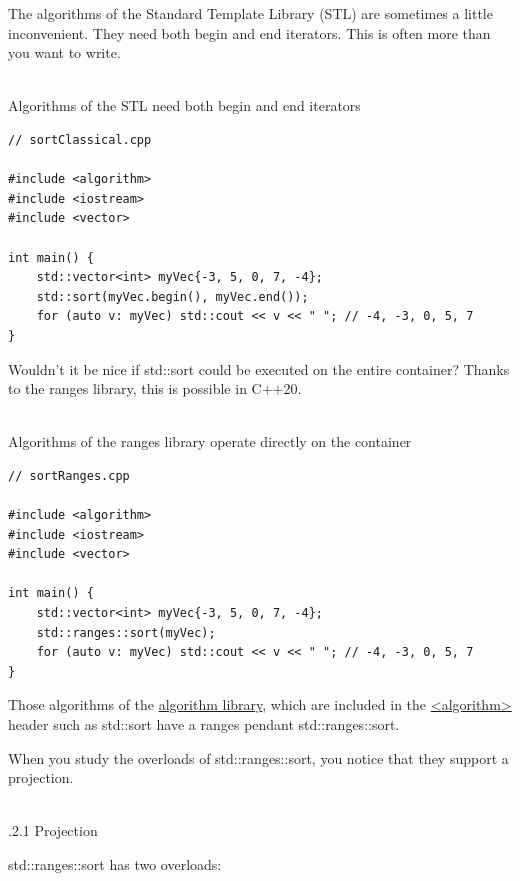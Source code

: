 
The algorithms of the Standard Template Library (STL) are sometimes a little inconvenient. They need both begin and end iterators. This is often more than you want to write.

\hspace*{\fill} \\ %
\noindent
Algorithms of the STL need both begin and end iterators
\begin{lstlisting}[style=styleCXX]
// sortClassical.cpp

#include <algorithm>
#include <iostream>
#include <vector>

int main() {
	std::vector<int> myVec{-3, 5, 0, 7, -4};
	std::sort(myVec.begin(), myVec.end());
	for (auto v: myVec) std::cout << v << " "; // -4, -3, 0, 5, 7
}
\end{lstlisting}

Wouldn’t it be nice if std::sort could be executed on the entire container? Thanks to the ranges library, this is possible in C++20.

\hspace*{\fill} \\ %
\noindent
Algorithms of the ranges library operate directly on the container
\begin{lstlisting}[style=styleCXX]
// sortRanges.cpp

#include <algorithm>
#include <iostream>
#include <vector>

int main() {
	std::vector<int> myVec{-3, 5, 0, 7, -4};
	std::ranges::sort(myVec);
	for (auto v: myVec) std::cout << v << " "; // -4, -3, 0, 5, 7
}
\end{lstlisting}

Those algorithms of the \href{https://en.cppreference.com/w/cpp/algorithm}{algorithm library}, which are included in the \href{https://en.cppreference.com/w/cpp/header/algorithm}{<algorithm>} header such as std::sort have a ranges pendant std::ranges::sort.

When you study the overloads of std::ranges::sort, you notice that they support a projection.

\hspace*{\fill} \\ %
.2.1\hspace{0.2cm} Projection

std::ranges::sort has two overloads:


